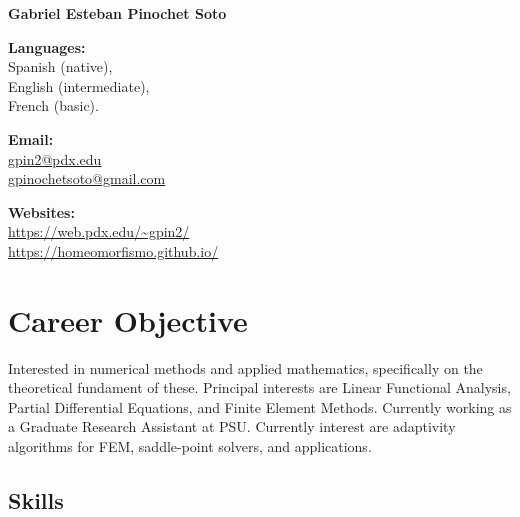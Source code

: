 \documentclass[12pt,letterpaper]{report}
\newcommand{\myname}{Gabriel Esteban Pinochet Soto}
\newcommand{\namefont}[1]{{\normalfont\bfseries\Huge{#1}}}
\begin{document}
    \raggedright{}

    \namefont{\myname}

    \vspace{1em}
    \begin{minipage}[t]{0.32\textwidth}
        {\bf Languages:}\\ Spanish (native), \\English (intermediate), \\ French (basic). 
    \end{minipage}
    \begin{minipage}[t]{0.32\textwidth}
        {\bf Email:}\\
        \href{mailto:gpin2@pdx.edu}{gpin2@pdx.edu}\\
        \href{mailto:gpinochetsoto@gmail.com}{gpinochetsoto@gmail.com}
    \end{minipage}
    \begin{minipage}[t]{0.32\textwidth}
        {\bf Websites:}\\
        \href{https://web.pdx.edu/~gpin2/}{https://web.pdx.edu/\textasciitilde gpin2/}\\
        \href{https://homeomorfismo.github.io/}{https://homeomorfismo.github.io/}\\
    \end{minipage}
    \hfill

    \section*{Career Objective}

    Interested in numerical methods and applied mathematics, specifically on the theoretical fundament of these.
    Principal interests are Linear Functional Analysis, Partial Differential Equations, and Finite Element Methods.
    Currently working as a Graduate Research Assistant at PSU.
    Currently interest are adaptivity algorithms for FEM, saddle-point solvers, and applications. 

    \subsection*{Skills}
\end{document}
